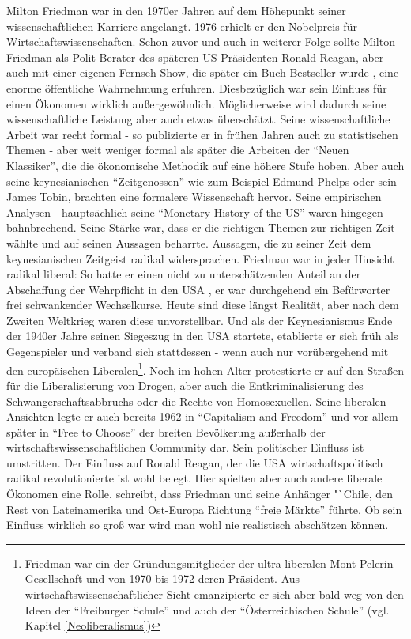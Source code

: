 Milton Friedman war in den 1970er Jahren auf dem Höhepunkt seiner wissenschaftlichen Karriere angelangt. 1976 erhielt er den Nobelpreis für Wirtschaftswissenschaften. Schon zuvor und auch in weiterer Folge sollte Milton Friedman als Polit-Berater des späteren US-Präsidenten Ronald Reagan, aber auch mit einer eigenen Fernseh-Show, die später ein Buch-Bestseller wurde \parencite{Friedman1980}, eine enorme öffentliche Wahrnehmung erfuhren. Diesbezüglich war sein Einfluss für einen Ökonomen wirklich außergewöhnlich. Möglicherweise wird dadurch seine wissenschaftliche Leistung aber auch etwas überschätzt.
Seine wissenschaftliche Arbeit war recht formal - so publizierte er in frühen Jahren auch zu statistischen Themen - aber weit weniger formal als später die Arbeiten der "`Neuen Klassiker"', die die ökonomische Methodik auf eine höhere Stufe hoben. Aber auch seine keynesianischen "`Zeitgenossen"' wie zum Beispiel Edmund Phelps oder sein  James Tobin, brachten eine formalere Wissenschaft hervor. Seine empirischen Analysen - hauptsächlich seine "`Monetary History of the US"' waren hingegen bahnbrechend.
Seine Stärke war, dass er die richtigen Themen zur richtigen Zeit wählte und auf seinen Aussagen beharrte. Aussagen, die zu seiner Zeit dem keynesianischen Zeitgeist radikal widersprachen. Friedman war in jeder Hinsicht radikal liberal: So hatte er einen nicht zu unterschätzenden Anteil an der Abschaffung der Wehrpflicht in den USA \textcite{Appelbaum2019}, er war durchgehend ein Befürworter frei schwankender Wechselkurse. Heute sind diese längst Realität, aber nach dem Zweiten Weltkrieg waren diese unvorstellbar. Und als der Keynesianismus Ende der 1940er Jahre seinen Siegeszug in den USA startete, etablierte er sich früh als Gegenspieler und verband sich stattdessen - wenn auch nur vorübergehend mit den europäischen Liberalen\footnote{Friedman war ein der Gründungsmitglieder der ultra-liberalen Mont-Pelerin-Gesellschaft und von 1970 bis 1972 deren Präsident. Aus wirtschaftswissenschaftlicher Sicht emanzipierte er sich aber bald weg von den Ideen der "`Freiburger Schule"' und auch der "`Österreichischen Schule"' (vgl. Kapitel \ref{Neoliberalismus})}. Noch im hohen Alter protestierte er auf den Straßen für die Liberalisierung von Drogen, aber auch die  Entkriminalisierung des Schwangerschaftsabbruchs oder die Rechte von Homosexuellen. Seine liberalen Ansichten legte er auch bereits 1962 in "`Capitalism and Freedom"' \parencite{Friedman1962} und vor allem später in "`Free to Choose"' \parencite{Friedman1980} der breiten Bevölkerung außerhalb der wirtschaftswissenschaftlichen Community dar. Sein politischer Einfluss ist umstritten. Der Einfluss auf Ronald Reagan, der die USA wirtschaftspolitisch radikal revolutionierte ist wohl belegt. Hier spielten aber auch andere liberale Ökonomen eine Rolle. \textcite[S. 77]{Warsh} schreibt, dass Friedman und seine Anhänger "`Chile, den Rest von Lateinamerika und Ost-Europa Richtung "`freie Märkte"' führte. Ob sein Einfluss wirklich so groß war wird man wohl nie realistisch abschätzen können.

